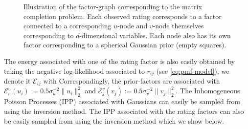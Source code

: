 \begin{figure}[!h]
\center
{}
\caption{\label{fig:pmf-graph} Illustration of the factor-graph corresponding to the matrix completion problem. Each observed rating corresponds to a factor connected to a corresponding $u$-node and $v$-node themselves corresponding to $d$-dimensional variables. Each node also has its own factor corresponding to a spherical Gaussian prior (empty squares).}
\end{figure} 


The energy associated with one of the rating factor is also easily obtained by taking the negative log-likelihood associated to $r_{ij}$ (see \eqref{eq:pmf-model}), we denote it $\mathcal E_{ij}$ with
%
%
Correspondingly, the prior-factors are associated with $\mathcal E^{u}_{i}(u_{i}):=0.5\sigma_{u}^{-2}\|u_{i}\|_{2}^{2}$ and $\mathcal E^{v}_{j}(v_{j}):=0.5\sigma_{v}^{-2}\|v_{j}\|_{2}^{2}$. The Inhomogeneous Poisson Processes (IPP) associated with Gaussians can easily be sampled from using the inversion method. 
The IPP associated with the rating factors can also be easily sampled from using the inversion method which we show below.

